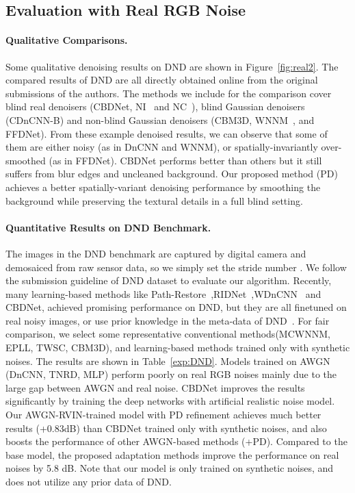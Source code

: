 \documentclass[letterpaper]{article} \usepackage{aaai20}  \usepackage{times}  \usepackage{helvet} \usepackage{courier}  \usepackage{comment}
\begin{document}
\subsection{Evaluation with Real RGB Noise}
\paragraph{Qualitative Comparisons.}
Some qualitative denoising results on DND are shown in Figure~\ref{fig:real2}. The compared results of DND are all directly obtained online from the original submissions of the authors. The methods we include for the comparison cover blind real denoisers (CBDNet, NI~\cite{NI} and NC~\cite{lebrun2015noise}), blind Gaussian denoisers (CDnCNN-B) and non-blind Gaussian denoisers (CBM3D, WNNM~\cite{gu2014weighted}, and FFDNet). From these example denoised results, we can observe that some of them are either noisy (as in DnCNN and WNNM), or spatially-invariantly over-smoothed (as in FFDNet). CBDNet performs better than others but it still suffers from blur edges and uncleaned background. Our proposed method (PD) achieves a better spatially-variant denoising performance by smoothing the background while preserving the textural details in a full blind setting. 

\paragraph{Quantitative Results on DND Benchmark.}
The images in the DND benchmark are captured by digital camera and demosaiced from raw sensor data, so we simply set the stride number . We follow the submission guideline of DND dataset to evaluate our algorithm. Recently, many learning-based methods like Path-Restore~\cite{yu2019path},RIDNet~\cite{anwar2019real},WDnCNN~\cite{zhao2019enhancement} and CBDNet, achieved promising performance on DND, but they are all finetuned on real noisy images, or use prior knowledge in the meta-data of DND~\cite{brooks2019unprocessing}. For fair comparison, we select some representative conventional methods(MCWNNM, EPLL, TWSC, CBM3D), and learning-based methods trained only with synthetic noises. The results are shown in Table~\ref{exp:DND}. Models trained on AWGN (DnCNN, TNRD, MLP) perform poorly on real RGB noises mainly due to the large gap between AWGN and real noise. CBDNet improves the results significantly by training the deep networks with artificial realistic noise model. Our AWGN-RVIN-trained model with PD refinement achieves much better results (+0.83dB) than CBDNet trained only with synthetic noises, and also boosts the performance of other AWGN-based methods (+PD). Compared to the base model, the proposed adaptation methods improve the performance on real noises by 5.8 dB. Note that our model is only trained on synthetic noises, and does not utilize any prior data of DND. 
\end{document}
